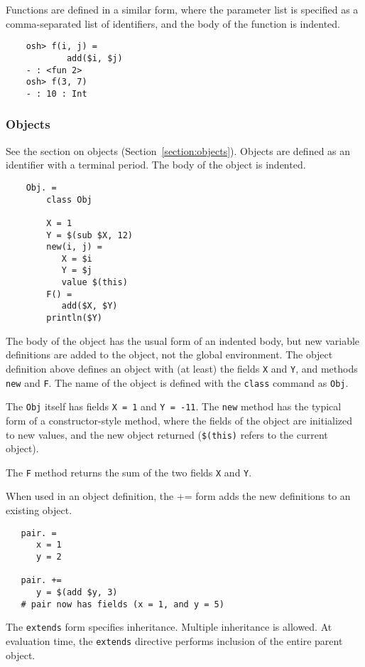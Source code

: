 Functions are defined in a similar form, where the parameter list is specified as a comma-separated
list of identifiers, and the body of the function is indented.

\begin{verbatim}
    osh> f(i, j) =
            add($i, $j)
    - : <fun 2>
    osh> f(3, 7)
    - : 10 : Int
\end{verbatim}

\subsubsection{Objects}

See the section on objects (Section~\ref{section:objects}).  Objects are defined as an identifier with a
terminal period.  The body of the object is indented.

\begin{verbatim}
    Obj. =
        class Obj

        X = 1
        Y = $(sub $X, 12)
        new(i, j) =
           X = $i
           Y = $j
           value $(this)
        F() =
           add($X, $Y)
        println($Y)
\end{verbatim}

The body of the object has the usual form of an indented body, but new variable definitions are
added to the object, not the global environment.  The object definition above defines an object with
(at least) the fields \verb+X+ and \verb+Y+, and methods \verb+new+ and \verb+F+.  The name of the
object is defined with the \verb+class+ command as \verb+Obj+.

The \verb+Obj+ itself has fields \verb+X = 1+ and \verb+Y = -11+.  The \verb+new+ method has the
typical form of a constructor-style method, where the fields of the object are initialized to new
values, and the new object returned (\verb+$(this)+ refers to the current object).

The \verb+F+ method returns the sum of the two fields \verb+X+ and \verb+Y+.

When used in an object definition, the += form adds the new definitions to an existing object.

\begin{verbatim}
   pair. =
      x = 1
      y = 2

   pair. +=
      y = $(add $y, 3)
   # pair now has fields (x = 1, and y = 5)
\end{verbatim}

The \verb+extends+ form specifies inheritance.  Multiple inheritance is allowed.  At evaluation
time, the \verb+extends+ directive performs inclusion of the entire parent object.

